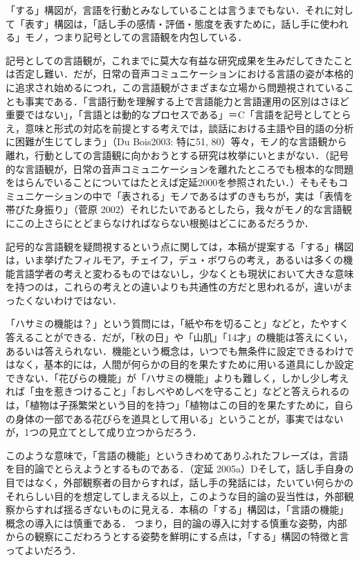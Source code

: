 \documentclass[japanese]{jnlp_1.3b}
\begin{document}
「する」構図が，言語を行動とみなしていることは言うまでもない．それに対して「表す」構図は，「話し手の感情・評価・態度を表すために，話し手に使われる」モノ，つまり記号としての言語観を内包している．

{\renewcommand{\baselinestretch}{}\selectfont
記号としての言語観が，これまでに莫大な有益な研究成果を生みだしてきたことは否定し難い．だが，日常の音声コミュニケーションにおける言語の姿が本格的に追求され始めるにつれ，この言語観がさまざまな立場から問題視されていることも事実である．「言語行動を理解する上で言語能力と言語運用の区別はさほど重要ではない」，「言語とは動的なプロセスである」＝C「言語を記号としてとらえ，意味と形式の対応を前提とする考えでは，談話における主語や目的語の分析に困難が生じてしまう」（Du Bois2003: 特に51, 80）等々，モノ的な言語観から離れ，行動としての言語観に向かおうとする研究は枚挙にいとまがない．（記号的な言語観が，日常の音声コミュニケーションを離れたところでも根本的な問題をはらんでいることについてはたとえば定延2000を参照されたい．）そもそもコミュニケーションの中で「表される」モノであるはずのきもちが，実は「表情を帯びた身振り」（菅原 2002）それじたいであるとしたら，我々がモノ的な言語観にこの上さらにとどまらなければならない根拠はどこにあるだろうか．

記号的な言語観を疑問視するという点に関しては，本稿が提案する「する」構図は，いま挙げたフィルモア，チェイフ，デュ・ボワらの考え，あるいは多くの機能言語学者の考えと変わるものではないし，少なくとも現状において大きな意味を持つのは，これらの考えとの違いよりも共通性の方だと思われるが，違いがまったくないわけではない．

「ハサミの機能は？」という質問には，「紙や布を切ること」などと，たやすく答えることができる．だが，「秋の日」や「山肌」「14才」の機能は答えにくい，あるいは答えられない．機能という概念は，いつでも無条件に設定できるわけではなく，基本的には，人間が何らかの目的を果たすために用いる道具にしか設定できない．「花びらの機能」が「ハサミの機能」よりも難しく，しかし少し考えれば「虫を惹きつけること」「おしべやめしべを守ること」などと答えられるのは，「植物は子孫繁栄という目的を持つ」「植物はこの目的を果たすために，自らの身体の一部である花びらを道具として用いる」ということが，事実ではないが，1つの見立てとして成り立つからだろう．
}

このような意味で，「言語の機能」というきわめてありふれたフレーズは，言語を目的論でとらえようとするものである．（定延 2005a）Dそして，話し手自身の目ではなく，外部観察者の目からすれば，話し手の発話には，たいてい何らかのそれらしい目的を想定してしまえる以上，このような目的論の妥当性は，外部観察からすれば揺るぎないものに見える．本稿の「する」構図は，「言語の機能」概念の導入には慎重である．
つまり，目的論の導入に対する慎重な姿勢，内部からの観察にこだわろうとする姿勢を鮮明にする点は，「する」構図の特徴と言ってよいだろう．
\end{document}
